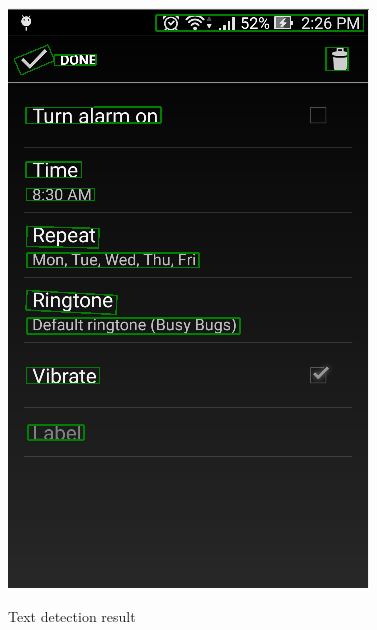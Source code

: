 \begin{figure}[H]
{	        \includegraphics[scale=0.65]{Chapters/Fig/text_detect_item.png}
	    }
	    \qquad
	    \qquad
	    \caption{Text detection result}
		\label{fig:text_detect}
	\end{figure}


